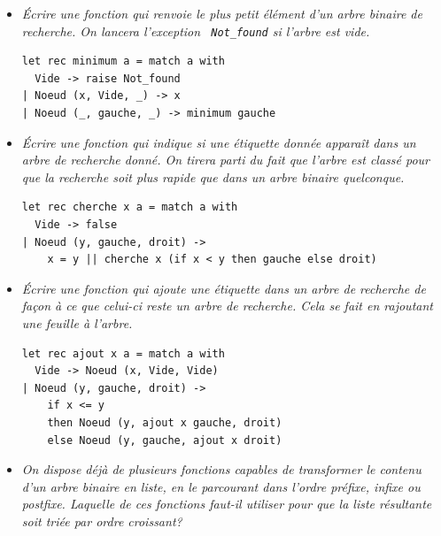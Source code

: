 \documentclass[11pt, a4paper]{article}
\begin{document}
\begin{itemize}

  \item \emph{Écrire une fonction qui renvoie le plus petit élément
        d'un arbre binaire de recherche. On lancera l'exception {\tt
        Not\_found} si l'arbre est vide.}

        \smallskip

\begin{verbatim}
let rec minimum a = match a with
  Vide -> raise Not_found
| Noeud (x, Vide, _) -> x
| Noeud (_, gauche, _) -> minimum gauche
\end{verbatim}

        \smallskip

  \item \emph{Écrire une fonction qui indique si une étiquette donnée
        apparaît dans un arbre de recherche donné. On tirera parti du
        fait que l'arbre est classé pour que la recherche soit plus
        rapide que dans un arbre binaire quelconque.}

        \smallskip

\begin{verbatim}
let rec cherche x a = match a with
  Vide -> false
| Noeud (y, gauche, droit) ->
    x = y || cherche x (if x < y then gauche else droit)
\end{verbatim}

        \smallskip

  \item \emph{Écrire une fonction qui ajoute une étiquette dans un
        arbre de recherche de façon à ce que celui-ci reste un arbre
        de recherche. Cela se fait en rajoutant une feuille à
        l'arbre.}

        \smallskip

\begin{verbatim}
let rec ajout x a = match a with
  Vide -> Noeud (x, Vide, Vide)
| Noeud (y, gauche, droit) ->
    if x <= y
    then Noeud (y, ajout x gauche, droit)
    else Noeud (y, gauche, ajout x droit)
\end{verbatim}

        \smallskip

  \item \emph{On dispose déjà de plusieurs fonctions capables de
        transformer le contenu d'un arbre binaire en liste, en le
        parcourant dans l'ordre préfixe, infixe ou postfixe. Laquelle
        de ces fonctions faut-il utiliser pour que la liste résultante
        soit triée par ordre croissant?}


\end{itemize}
\end{document}
